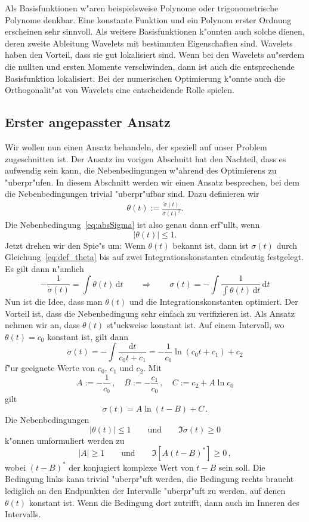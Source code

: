 \documentclass[a4paper]{scrartcl}
\newcommand{\de}{{\mathrm{d}}}
\begin{document}
Als Basisfunktionen w"aren beispielsweise Polynome oder trigonometrische Polynome denkbar. Eine konstante Funktion und ein Polynom erster Ordnung erscheinen sehr sinnvoll. Als weitere Basisfunktionen k"onnten auch solche dienen, deren zweite Ableitung Wavelets mit bestimmten Eigenschaften sind. Wavelets haben den Vorteil, dass sie gut lokalisiert sind. Wenn bei den Wavelets au"serdem die nullten und ersten Momente verschwinden, dann ist auch die entsprechende Basisfunktion lokalisiert. Bei der numerischen Optimierung k"onnte auch die Orthogonalit"at von Wavelets eine entscheidende Rolle spielen. 


\subsection{Erster angepasster Ansatz}

Wir wollen nun einen Ansatz behandeln, der speziell auf unser Problem zugeschnitten ist. Der Ansatz im vorigen Abschnitt hat den Nachteil, dass es aufwendig sein kann, die Nebenbedingungen w"ahrend des Optimierens zu "uberpr"ufen. In diesem Abschnitt werden wir einen Ansatz besprechen, bei dem die Nebenbedingungen trivial "uberpr"ufbar sind. Dazu definieren wir
\begin{align} \label{eq:def_theta} 
\theta(t) := \frac{\ddot\sigma(t)}{\dot\sigma(t)^2}. 
\end{align}
Die Nebenbedingung~\eqref{eq:absSigma} ist also genau dann erf"ullt, wenn 
$$ |\theta(t)| \le 1. $$
Jetzt drehen wir den Spie"s um: Wenn $\theta(t)$ bekannt ist, dann ist $\sigma(t)$ durch Gleichung~\eqref{eq:def_theta} bis auf zwei Integrationskonstanten eindeutig festgelegt. Es gilt dann n"amlich 
$$ -\frac{1}{\dot\sigma(t)} = \int\theta(t)\,\de t 
\qquad \Longrightarrow \qquad 
\sigma(t) = -\int \frac{1}{\int\theta(t)\,\de t}\,\de t $$
Nun ist die Idee, dass man $\theta(t)$ und die Integrationskonstanten optimiert. Der Vorteil ist, dass die Nebenbedingung sehr einfach zu verifizieren ist. Als Ansatz nehmen wir an, dass $\theta(t)$ st"uckweise konstant ist. Auf einem Intervall, wo $\theta(t)=c_0$ konstant ist, gilt dann 
$$ \sigma(t) = -\int \frac{\de t}{c_0t + c_1}
=-\frac{1}{c_0}\ln(c_0t+c_1) + c_2 $$
f"ur geeignete Werte von $c_0$, $c_1$ und $c_2$. Mit 
$$ A := -\frac{1}{c_0}\,, \quad
B:= -\frac{c_1}{c_0}\,, \quad
C:= c_2 + A\ln c_0 $$
gilt 
$$ \sigma(t) = A\ln(t-B) + C\,. $$
Die Nebenbedingungen 
$$ |\theta(t)| \le 1 \qquad \text{und} \qquad
\Im\dot\sigma(t)\ge 0 $$
k"onnen umformuliert werden zu
$$ |A|\ge 1 \qquad \text{und}\qquad
\Im\left[A(t-B)^*\right]\ge 0\,, $$
wobei $(t-B)^*$ der konjugiert komplexe Wert von $t-B$ sein soll. Die Bedingung links kann trivial "uberpr"uft werden, die Bedingung rechts braucht lediglich an den Endpunkten der Intervalle "uberpr"uft zu werden, auf denen $\theta(t)$ konstant ist. Wenn die Bedingung dort zutrifft, dann auch im Inneren des Intervalls. 
\end{document}
